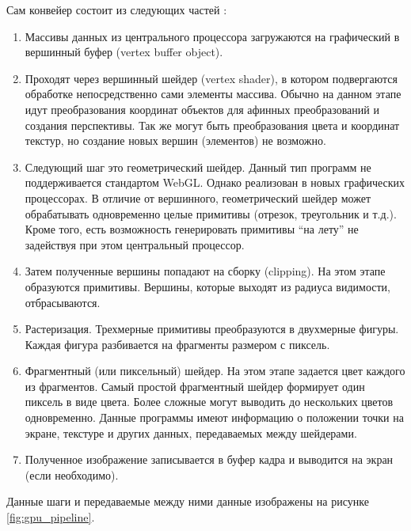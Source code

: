 Сам конвейер состоит из следующих частей \cite{hgpuw}:

\begin{enumerate}
  \item Массивы данных из центрального процессора загружаются на графический в вершинный буфер
    (vertex buffer object).

  \item Проходят через вершинный шейдер (vertex shader), в котором подвергаются обработке 
    непосредственно сами элементы массива. Обычно на данном этапе идут преобразования 
    координат объектов для афинных преобразований и создания перспективы. Так же 
    могут быть преобразования цвета и координат текстур, но создание новых вершин 
    (элементов) не возможно.

  \item Следующий шаг это геометрический шейдер. Данный тип программ не поддерживается
    стандартом WebGL. Однако реализован в новых графических процессорах. В отличие 
    от вершинного, геометрический шейдер может обрабатывать одновременно целые примитивы 
    (отрезок, треугольник и т.д.). Кроме того, есть возможность генерировать примитивы 
    ``на лету'' не задействуя при этом центральный процессор.

  \item Затем полученные вершины попадают на сборку (clipping). На этом этапе образуются
    примитивы. Вершины, которые выходят из радиуса видимости, отбрасываются.

  \item Растеризация. Трехмерные примитивы преобразуются в двухмерные фигуры. Каждая фигура
    разбивается на фрагменты размером с пиксель.

  \item Фрагментный (или пиксельный) шейдер. На этом этапе задается цвет каждого из фрагментов.
    Самый простой фрагментный шейдер формирует один пиксель в виде цвета. Более сложные могут 
    выводить до нескольких цветов одновременно. Данные программы имеют информацию о положении 
    точки на экране, текстуре и других данных, передаваемых между шейдерами.

  \item Полученное изображение записывается в буфер кадра и выводится на экран (если необходимо).
\end{enumerate}

Данные шаги и передаваемые между ними данные изображены на рисунке \ref{fig:gpu_pipeline}.

